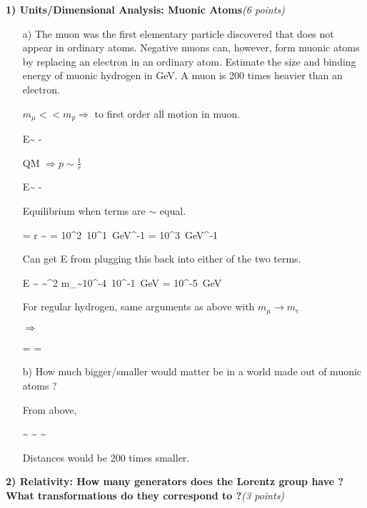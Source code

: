 {\large




\textbf{1) Units/Dimensional Analysis:  Muonic Atoms}\hfill \textit{(6 points)}\\  

\begin{itemize}
\item[a)] The muon was the first elementary particle discovered that does not appear in ordinary atoms.  Negative muons can, however, form muonic atoms by replacing an electron in an ordinary atom. 
Estimate the size and binding energy of muonic hydrogen in GeV. A muon is 200 times heavier than an electron. 

$m_\mu << m_p \Rightarrow $ to first order all motion in muon. 


\be
E\sim {} -  
\ee


QM $\Rightarrow  p \sim \frac{1}{r}$ 


\be
E\sim {} -  
\ee

Equilibrium when terms are $\sim$ equal.

\be
{} =  \Rightarrow r \sim {} = 10^2\ 10^1\ GeV^{-1} = 10^3\ GeV^{-1}
\ee

Can get E from plugging this back into either of the two terms.

\be
E \sim {} \sim \alpha^2 m_\mu \sim 10^{-4}\ 10^{-1}\ GeV = 10^{-5}\ GeV
\ee

For regular hydrogen, same arguments as above with $m_\mu \rightarrow m_e$

$\Rightarrow$

\be
{} =  =  
\ee


\item[b)] How much bigger/smaller would matter be in a world made out of muonic atoms ?

From above,

\be
{} \sim {} \times {} \sim {} \sim {}
\ee

Distances would be 200 times smaller.

\end{itemize}

\clearpage 
\textbf{2)  Relativity: How many generators does the Lorentz group have ? What transformations do they correspond to ?}\hfill \textit{(3 points)}

}

